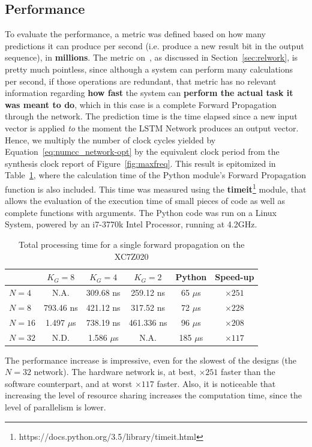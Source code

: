 \documentclass{IEEEtran}
\begin{document}
\subsection{Performance}
To evaluate the performance, a metric was defined based on how many predictions it can produce per second (i.e. produce a new result bit in the output sequence),
in \textbf{millions}. The metric on~\cite{Chang15}, as discussed in Section~\ref{sec:relwork}, is pretty much pointless, since
although a system can perform many calculations per second, if those operations are redundant, that metric has no relevant information
regarding \textbf{how fast} the system can \textbf{perform the actual task it was meant to do}, which in this case is a complete Forward
Propagation through the network. The prediction time is the time elapsed since a new input vector is applied \emph{to} the moment the LSTM
Network produces an output vector. Hence, we multiply the number of clock cycles yielded by Equation~\ref{eq:numcc_network-opt} by the equivalent clock period
from the synthesis clock report of Figure~\ref{fig:maxfreq}.
This result is epitomized in Table~\ref{tab:process-time}, where the calculation time of the Python module's Forward Propagation function is
also included. This time was measured using the \textbf{timeit}\footnote{https://docs.python.org/3.5/library/timeit.html}  module, that allows
the evaluation of the execution time of small pieces of code as well as complete functions with arguments. The Python code was run on a Linux System,
powered by an i7-3770k Intel Processor, running at 4.2GHz.

\begin{table}
	\caption{Total processing time for a single forward propagation on the XC7Z020}
	\label{tab:process-time}
    \centering
    \begin{tabular}{ | l | c | c | c | c | c | }
    \hline
    & $K_G=8$  & $K_G=4$ & $K_G=2$ & Python & Speed-up \\
    \hline
    $N=4$ & N.A.  & 309.68 ns  & 259.12 ns & 65 $\mu$s & $\times251$ \\
    \hline
    $N=8$ & 793.46 ns  & 421.12 ns  &  317.52 ns & 72 $\mu$s & $\times228$ \\
    \hline
    $N=16$ & 1.497 $\mu$s  & 738.19 ns  & 461.336 ns & 96 $\mu$s & $\times208$ \\
    \hline
    $N=32$ & N.D.          & 1.586 $\mu$s & N.A.       & 185 $\mu$s  &  $\times117$ \\
\hline
  \end{tabular}
\end{table}
The performance increase is impressive, even for the slowest of the designs (the $N=32$ network). The hardware network is, at best, $\times251$ faster than the software counterpart,
and at worst $\times117$ faster. Also, it is noticeable that increasing the level of resource sharing increases the computation time, since the level of parallelism is lower.
\end{document}
